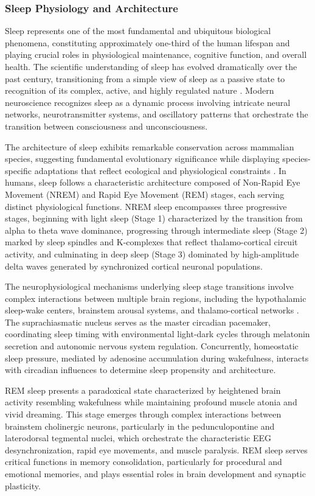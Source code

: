 \documentclass[a4paper,12pt,twoside]{article}
\begin{document}
\subsubsection{Sleep Physiology and Architecture}

Sleep represents one of the most fundamental and ubiquitous biological phenomena, constituting approximately one-third of the human lifespan and playing crucial roles in physiological maintenance, cognitive function, and overall health. The scientific understanding of sleep has evolved dramatically over the past century, transitioning from a simple view of sleep as a passive state to recognition of its complex, active, and highly regulated nature \cite{carskadon2017normal}. Modern neuroscience recognizes sleep as a dynamic process involving intricate neural networks, neurotransmitter systems, and oscillatory patterns that orchestrate the transition between consciousness and unconsciousness.

The architecture of sleep exhibits remarkable conservation across mammalian species, suggesting fundamental evolutionary significance while displaying species-specific adaptations that reflect ecological and physiological constraints \cite{siegel2009sleep}. In humans, sleep follows a characteristic architecture composed of Non-Rapid Eye Movement (NREM) and Rapid Eye Movement (REM) stages, each serving distinct physiological functions. NREM sleep encompasses three progressive stages, beginning with light sleep (Stage 1) characterized by the transition from alpha to theta wave dominance, progressing through intermediate sleep (Stage 2) marked by sleep spindles and K-complexes that reflect thalamo-cortical circuit activity, and culminating in deep sleep (Stage 3) dominated by high-amplitude delta waves generated by synchronized cortical neuronal populations.

The neurophysiological mechanisms underlying sleep stage transitions involve complex interactions between multiple brain regions, including the hypothalamic sleep-wake centers, brainstem arousal systems, and thalamo-cortical networks \cite{saper2010sleep}. The suprachiasmatic nucleus serves as the master circadian pacemaker, coordinating sleep timing with environmental light-dark cycles through melatonin secretion and autonomic nervous system regulation. Concurrently, homeostatic sleep pressure, mediated by adenosine accumulation during wakefulness, interacts with circadian influences to determine sleep propensity and architecture.

REM sleep presents a paradoxical state characterized by heightened brain activity resembling wakefulness while maintaining profound muscle atonia and vivid dreaming. This stage emerges through complex interactions between brainstem cholinergic neurons, particularly in the pedunculopontine and laterodorsal tegmental nuclei, which orchestrate the characteristic EEG desynchronization, rapid eye movements, and muscle paralysis. REM sleep serves critical functions in memory consolidation, particularly for procedural and emotional memories, and plays essential roles in brain development and synaptic plasticity.
\end{document}
